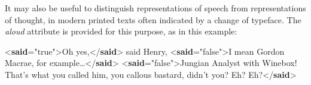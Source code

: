 It may also be useful to distinguish representations of speech from representations of thought, in modern printed texts often indicated by a change of typeface. The {\itshape aloud} attribute is provided for this purpose, as in this example: \par\bgroup{}\exampleFont \begin{shaded}\noindent\mbox{}{<\textbf{said}\hspace*{1em}{aloud}="{true}">}Oh yes,{</\textbf{said}>} said Henry, \mbox{}\newline 
{<\textbf{said}\hspace*{1em}{aloud}="{false}">}I mean\mbox{}\newline 
 Gordon Macrae, for example…{</\textbf{said}>}\mbox{}\newline 
{<\textbf{said}\hspace*{1em}{aloud}="{false}">}Jungian\mbox{}\newline 
 Analyst with Winebox! That's what you called him, you callous bastard,\mbox{}\newline 
 didn't you? Eh? Eh?{</\textbf{said}>}\end{shaded}\egroup\par \par
